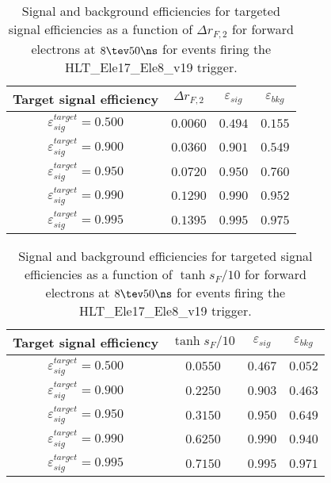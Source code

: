 \clearpage

\begin{table}[!bht]
  \begin{center}
    \begin{tabular}{cccc}
      \hline
      Target signal efficiency & $\Delta r_{F,2}$ & $\varepsilon_{sig}$ & $\varepsilon_{bkg}$ \\ 
      \hline
      $\varepsilon_{sig}^{target} = 0.500$ & $  0.0060$ & $0.494$ & $0.155$ \\
      $\varepsilon_{sig}^{target} = 0.900$ & $  0.0360$ & $0.901$ & $0.549$ \\
      $\varepsilon_{sig}^{target} = 0.950$ & $  0.0720$ & $0.950$ & $0.760$ \\
      $\varepsilon_{sig}^{target} = 0.990$ & $  0.1290$ & $0.990$ & $0.952$ \\
      $\varepsilon_{sig}^{target} = 0.995$ & $  0.1395$ & $0.995$ & $0.975$ \\
      \hline
    \end{tabular}
    \caption{Signal and background efficiencies for targeted signal efficiencies as a function of $\Delta r_{F,2}$ for forward electrons at $8\tev 50\ns$ for events firing the HLT\_Ele17\_Ele8\_v19 trigger.}
    \label{tab:eff_rej_r2F_beam_8_50_trigger_17_8_F}
  \end{center}
\end{table}

\clearpage

\begin{table}[!bht]
  \begin{center}
    \begin{tabular}{cccc}
      \hline
      Target signal efficiency & $\tanh{s_F/10}$ & $\varepsilon_{sig}$ & $\varepsilon_{bkg}$ \\ 
      \hline
      $\varepsilon_{sig}^{target} = 0.500$ & $  0.0550$ & $0.467$ & $0.052$ \\
      $\varepsilon_{sig}^{target} = 0.900$ & $  0.2250$ & $0.903$ & $0.463$ \\
      $\varepsilon_{sig}^{target} = 0.950$ & $  0.3150$ & $0.950$ & $0.649$ \\
      $\varepsilon_{sig}^{target} = 0.990$ & $  0.6250$ & $0.990$ & $0.940$ \\
      $\varepsilon_{sig}^{target} = 0.995$ & $  0.7150$ & $0.995$ & $0.971$ \\
      \hline
    \end{tabular}
    \caption{Signal and background efficiencies for targeted signal efficiencies as a function of $\tanh{s_F/10}$ for forward electrons at $8\tev 50\ns$ for events firing the HLT\_Ele17\_Ele8\_v19 trigger.}
    \label{tab:eff_rej_sF_beam_8_50_trigger_17_8_F}
  \end{center}
\end{table}

